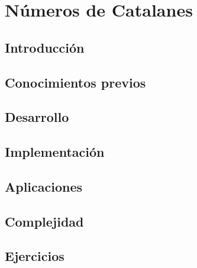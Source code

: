 \chapter{Números de Catalanes}
\section{Introducción}

\section{Conocimientos previos}

\section{Desarrollo}

\section{Implementación}

\section{Aplicaciones}

\section{Complejidad}

\section{Ejercicios}
